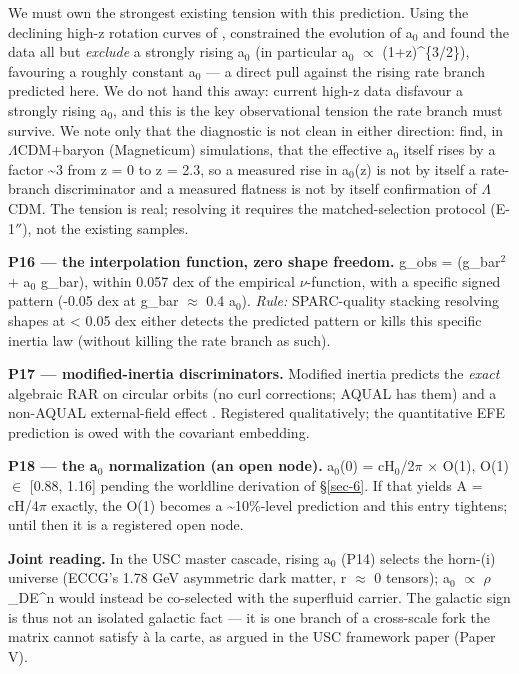 \documentclass[aps,prd,preprint,nofootinbib,superscriptaddress]{revtex4-2}
\begin{document}
We must own the strongest existing tension with this prediction. Using
the declining high-z rotation curves of \citep{Genzel:2017jgd},
\citep{Milgrom:2017hpv} constrained the evolution of a\(_{0}\) and found
the data all but \emph{exclude} a strongly rising a\(_{0}\) (in
particular a\(_{0}\) \(\propto\) (1+z)\^{}\{3/2\}), favouring a roughly
constant a\(_{0}\) --- a direct pull against the rising rate branch
predicted here. We do not hand this away: current high-z data disfavour
a strongly rising a\(_{0}\), and this is the key observational tension
the rate branch must survive. We note only that the diagnostic is not
clean in either direction: \citep{Mayer:2022qhk} find, in
\(\Lambda\)CDM+baryon (Magneticum) simulations, that the effective
a\(_{0}\) itself rises by a factor \textasciitilde3 from z = 0 to z =
2.3, so a measured rise in a\(_{0}\)(z) is not by itself a rate-branch
discriminator and a measured flatness is not by itself confirmation of
\(\Lambda\)CDM. The tension is real; resolving it requires the
matched-selection protocol (E-1\(''\)), not the existing samples.

\textbf{P16 --- the interpolation function, zero shape freedom.} g\_obs
= \surd (g\_bar\(^{2}\) + a\(_{0}\) g\_bar), within 0.057 dex of the
empirical \(\nu\)-function, with a specific signed pattern (-0.05 dex at
g\_bar \(\approx\) 0.4 a\(_{0}\)). \emph{Rule:} SPARC-quality stacking
resolving shapes at \textless{} 0.05 dex either detects the predicted
pattern or kills this specific inertia law (without killing the rate
branch as such).

\textbf{P17 --- modified-inertia discriminators.} Modified inertia
\citep{Milgrom:2022ifm} predicts the \emph{exact} algebraic RAR on
circular orbits (no curl corrections; AQUAL has them) and a non-AQUAL
external-field effect \citep{Famaey:2011kh}. Registered qualitatively;
the quantitative EFE prediction is owed with the covariant embedding.

\textbf{P18 --- the a\(_{0}\) normalization (an open node).}
a\(_{0}\)(0) = cH\(_{0}\)/2\(\pi\) × O(1), O(1) \(\in\) {[}0.88, 1.16{]}
pending the worldline derivation of §\ref{sec-6}. If that yields A =
cH/4\(\pi\) exactly, the O(1) becomes a \textasciitilde10\%-level
prediction and this entry tightens; until then it is a registered open
node.

\textbf{Joint reading.} In the USC master cascade, rising a\(_{0}\)
(P14) selects the horn-(i) universe (ECCG's 1.78 GeV asymmetric dark
matter, r \(\approx\) 0 tensors); a\(_{0}\) \(\propto\)
\(\rho\)\_DE\^{}n would instead be co-selected with the superfluid
carrier. The galactic sign is thus not an isolated galactic fact --- it
is one branch of a cross-scale fork the matrix cannot satisfy à la
carte, as argued in the USC framework paper (Paper V).
\end{document}

